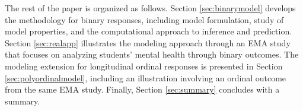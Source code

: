 The rest of the paper is organized as follows. 
Section \ref{sec:binarymodel} develops the methodology for binary responses, including
model formulation, study of model properties, and the computational approach to 
inference and prediction.
Section \ref{sec:realapp} illustrates the modeling approach through an EMA study that 
focuses on analyzing students' mental health through binary outcomes. The modeling extension 
for longitudinal ordinal responses is presented in Section \ref{sec:polyordinalmodel}, 
including an illustration involving an ordinal outcome from the same EMA study. Finally, 
Section \ref{sec:summary} concludes with a summary.



 